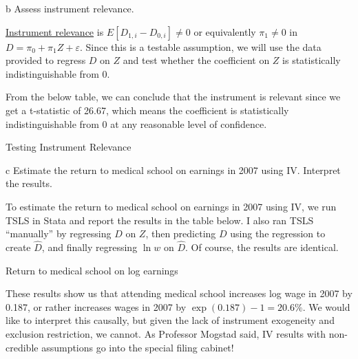 \documentclass{article}
\begin{document}
\begin{problem}{b}
Assess instrument relevance.
\end{problem}
\begin{solution}
\underline{Instrument relevance} is $E[D_{1,i}-D_{0,i}]\neq 0$ or equivalently $\pi_1 \neq 0$ in $D = \pi_0 + \pi_1 Z + \varepsilon$. Since this is a testable assumption, we will use the data provided to regress $D$ on $Z$ and test whether the coefficient on $Z$ is statistically indistinguishable from 0.

From the below table, we can conclude that the instrument is relevant since we get a t-statistic of 26.67, which means the coefficient is statistically indistinguishable from 0 at any reasonable level of confidence.
\begin{table}[H]
    \centering
    
    \caption{Testing Instrument Relevance}
\end{table}
\end{solution}

\begin{problem}{c}
Estimate the return to medical school on earnings in 2007 using IV. Interpret the results.
\end{problem}
\begin{solution}
To estimate the return to medical school on earnings in 2007 using IV, we run TSLS in Stata and report the results in the table below. I also ran TSLS ``manually'' by regressing $D$ on $Z$, then predicting $D$ using the regression to create $\widehat{D}$, and finally regressing $\ln w$ on $\widehat{D}$. Of course, the results are identical.

\begin{table}[H]
    \centering
    
    \caption{Return to medical school on log earnings}
\end{table}

These results show us that attending medical school increases log wage in 2007 by 0.187, or rather increases wages in 2007 by $\exp(0.187)-1=20.6\%$. We would like to interpret this causally, but given the lack of instrument exogeneity and exclusion restriction, we cannot. As Professor Mogstad said, IV results with non-credible assumptions go into the special filing cabinet!
\end{solution}
\end{document}
